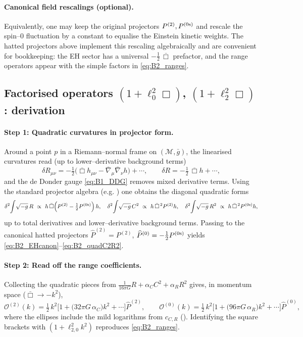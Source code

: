 \documentclass{iopjournal}
\begin{document}
\paragraph{Canonical field rescalings (optional).}
Equivalently, one may keep the original projectors $P^{(2)},P^{(0{\rm s})}$ and rescale the spin–0 fluctuation by a constant to equalise the Einstein kinetic weights. The hatted projectors above implement this rescaling algebraically and are convenient for bookkeeping: the EH sector has a universal $-\tfrac12\,\bar\Box$ prefactor, and the range operators appear with the simple factors in \eqref{eq:B2_ranges}.
\medskip

\subsection{\texorpdfstring
  {Factorised operators $(1+\ell_0^2\Box)$, $(1+\ell_2^2\Box)$: derivation}{Factorised operators (1+ell02 Box), (1+ell22 Box): derivation}}\label{app:B3}


\paragraph{Step 1: Quadratic curvatures in projector form.}
Around a point $p$ in a Riemann–normal frame on $(\mathcal M,\bar g)$, the linearised curvatures read (up to lower–derivative background terms)
\[
\delta R_{\mu\nu}=-\tfrac12\big(\bar\Box h_{\mu\nu}-\bar\nabla_\mu\bar\nabla_\nu h\big)+\cdots,
\qquad
\delta R=-\tfrac12\,\bar\Box h+\cdots,
\]
and the de Donder gauge \eqref{eq:B1_DDG} removes mixed derivative terms. Using the standard projector algebra (e.g. \cite{Stelle1977,ParkerToms}) one obtains the diagonal quadratic forms
\[
\delta^2\!\int\!\sqrt{-g}\,R
\ \propto\
h\,\bar\Box\!\left(P^{(2)}-\tfrac12 P^{(0{\rm s})}\right)h,
\quad
\delta^2\!\int\!\sqrt{-g}\,C^2
\ \propto\
h\,\bar\Box^{\,2}P^{(2)}h,
\quad
\delta^2\!\int\!\sqrt{-g}\,R^2
\ \propto\
h\,\bar\Box^{\,2}P^{(0{\rm s})}h,
\]
up to total derivatives and lower–derivative background terms. Passing to the canonical hatted projectors \(\widehat P^{(2)}=P^{(2)}\), \(\widehat P^{(0)}=-\tfrac12 P^{(0{\rm s})}\) yields \eqref{eq:B2_EHcanon}–\eqref{eq:B2_quadC2R2}.

\paragraph{Step 2: Read off the range coefficients.}
Collecting the quadratic pieces from
\(\tfrac{1}{16\pi G}R+\alpha_C C^2+\alpha_R R^2\)
gives, in momentum space ($\bar\Box\to-k^2$),
\[
\mathcal{O}^{(2)}(k)=\tfrac12\,k^2\Big[1+\big(32\pi G\,\alpha_C\big)k^2+\cdots\Big]\widehat P^{(2)},
\qquad
\mathcal{O}^{(0)}(k)=\tfrac12\,k^2\Big[1+\big(96\pi G\,\alpha_R\big)k^2+\cdots\Big]\widehat P^{(0)},
\]
where the ellipses include the mild logarithms from $c_{C,R}$ (). Identifying the square brackets with $(1+\ell_{2,0}^2 k^2)$ reproduces \eqref{eq:B2_ranges}.
\end{document}

